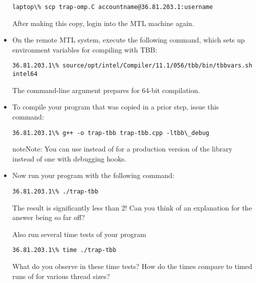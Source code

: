 \documentclass[letterpaper,10pt,openany,oneside]{sphinxmanual}
\begin{document}
\begin{itemize}
\begin{Verbatim}[commandchars=\\\{\}]
laptop\% scp trap-omp.C accountname@36.81.203.1:username
\end{Verbatim}

After making this copy, login into the MTL machine  again.

\item {} 
On the remote MTL system, execute the following command, which sets up environment variables for compiling with TBB:

\begin{Verbatim}[commandchars=\\\{\}]
36.81.203.1\% source/opt/intel/Compiler/11.1/056/tbb/bin/tbbvars.sh intel64
\end{Verbatim}

The  command-line argument prepares for 64-bit compilation.

\item {} 
To compile your program that was copied in a prior step, issue this command:

\begin{Verbatim}[commandchars=\\\{\}]
36.81.203.1\% g++ -o trap-tbb trap-tbb.cpp -ltbb\_debug
\end{Verbatim}

\begin{notice}{note}{Note:}
You can use  instead of  for a production version of the library instead of one with debugging hooks.
\end{notice}

\item {} 
Now run your program with the following command:

\begin{Verbatim}[commandchars=\\\{\}]
36.81.203.1\% ./trap-tbb
\end{Verbatim}

The result is significantly less than 2! Can you think of an explanation for the answer being so far off?

Also run several time tests of your program

\begin{Verbatim}[commandchars=\\\{\}]
36.81.203.1\% time ./trap-tbb
\end{Verbatim}

What do you observe in these time tests? How do the times compare to timed runs of  for various thread sizes?

\end{itemize}
\end{document}

